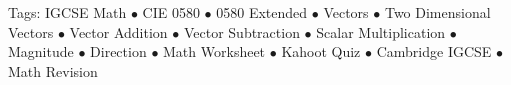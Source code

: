\documentclass[11pt,a4paper]{article}
\begin{document}
\vspace{14pt}
\begin{center}
  \sffamily\scriptsize\textcolor{textmuted}{
    Tags: IGCSE Math $\bullet$ CIE 0580 $\bullet$ 0580 Extended $\bullet$ Vectors $\bullet$ Two Dimensional Vectors $\bullet$ Vector Addition $\bullet$ Vector Subtraction $\bullet$ Scalar Multiplication $\bullet$ Magnitude $\bullet$ Direction $\bullet$ Math Worksheet $\bullet$ Kahoot Quiz $\bullet$ Cambridge IGCSE $\bullet$ Math Revision
  }
\end{center}
\end{document}
